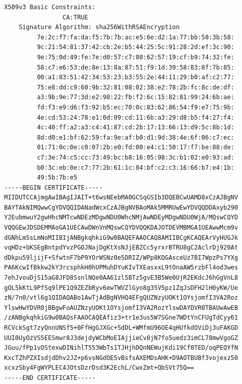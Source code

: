 \documentclass[a4paper]{report}
\begin{document}
\begin{lstlisting}[language={}, basicstyle=\ttfamily\scriptsize, numberstyle=\ttfamily\scriptsize, stepnumber=5, firstnumber=1, numberfirstline=false]
            X509v3 Basic Constraints: 
                CA:TRUE
    Signature Algorithm: sha256WithRSAEncryption
         7e:2c:f7:fa:da:f5:7b:7b:ac:e5:6e:d2:1a:77:bb:58:3b:58:
         9c:21:54:81:37:42:cb:2e:b5:44:25:5c:91:28:2d:ef:3c:90:
         9e:75:0d:49:fe:7e:d0:57:c7:80:62:57:19:cf:b9:74:32:fe:
         58:c7:e6:53:de:8e:13:8a:87:51:f9:1d:39:58:83:8f:7b:85:
         00:a1:83:51:42:34:53:23:b3:55:2e:44:11:29:b0:af:c2:77:
         75:e8:dd:c9:60:9b:32:81:08:02:38:e2:78:2b:fc:8c:de:df:
         a3:9b:9e:77:3d:e2:98:22:fb:f2:6c:15:82:81:99:24:6b:ae:
         fd:f3:e9:d6:f3:92:b5:ec:70:0c:83:62:86:54:f9:e7:75:9b:
         4e:cd:53:24:78:e1:0d:09:cd:11:6b:a3:29:d8:b5:f4:27:f4:
         4c:40:ff:a2:a3:c4:41:87:cd:2b:17:13:66:13:d9:5c:8b:1d:
         8d:d0:e1:bf:62:59:fa:9e:af:b0:d1:9d:38:4e:6f:06:c7:ec:
         01:71:0c:0e:c0:07:2b:e0:fd:00:e4:c1:50:17:f7:be:88:de:
         c7:3e:74:c5:cc:73:49:bc:b8:16:05:98:3c:b1:02:e0:93:ad:
         b0:3c:eb:0e:c7:77:2b:61:1c:84:bf:c2:c3:16:66:b7:e4:1b:
         49:5b:7b:e5
-----BEGIN CERTIFICATE-----
MIIDUTCCAjmgAwIBAgIJAIT+t6wsNEebMA0GCSqGSIb3DQEBCwUAMD8xCzAJBgNV
BAYTAkNIMQwwCgYDVQQIDANadWcxCzAJBgNVBAoMAk5MMRUwEwYDVQQDDAxyb290
Y2EubmwuY2gwHhcNMTcwNDEzMDgwNDU0WhcNMjAwNDEyMDgwNDU0WjA/MQswCQYD
VQQGEwJDSDEMMAoGA1UECAwDWnVnMQswCQYDVQQKDAJOTDEVMBMGA1UEAwwMcm9v
dGNhLm5sLmNoMIIBIjANBgkqhkiG9w0BAQEFAAOCAQ8AMIIBCgKCAQEArVyHUGJk
vqHDz+bKSEgBntpdYvzPGOJNajDgKtXsNJjEBZCc5yrxrBTRU8gC2AclrDj920At
dDkpu59ljijF+SfwtnF7bP9YOrWSNz0e5DRIZ/WPp8KQGAsceUz7BI7WpzPs7YXg
PA6KcwIfBkkw2kY3rcsphkH0hUPMuhDYuKIvTXEasxxL9tOnaAW5rzbFl4od3wes
7ehJvouDjS15aG8JFD8SsnlNQe0AA61zl5BTz5gvE3B5We0UjR2EKdcJ6hGgVnL8
gOL5kKtL9PfSq9lPE1Q9ZEZbRyv6ewTWVZlGyo8g35V5pz1ZqJsDFH2lH0yKW/Ue
zN/7n0/vtl6g1QIDAQABo1AwTjAdBgNVHQ4EFgQUZNzyUOKt1OYsjomfI3VA2Roz
YlswHwYDVR0jBBgwFoAUZNzyUOKt1OYsjomfI3VA2RozYlswDAYDVR0TBAUwAwEB
/zANBgkqhkiG9w0BAQsFAAOCAQEAfiz3+tr1e3us5W7SGne7WDtYnCFUgTdCyy61
RCVckSgt7zyQnnUNSf5+0FfHgGJXGc+5dDL+WMfmU96OE4qHUfkdOViDj3uFAKGD
UUI0UyOzVS5EESmwr8J3dejdyWCbMoEIAjjieCv8jN7fo5uedz3imCL78mwVgoGZ
JGuu/fPp1vOStexwDINihlT553WbTs1TJHjhDQnNEWujKdi19Cf0TED/oqPEQYfN
KxcTZhPZXIsdjdDhv2JZ+p6vsNGdOE5vBsfsAXEMDsAHK+D9AOTBUBf3vojexz50
xcxzSby4FgWYPLEC4JOtsDzrDsd3K2EchL/CwxZmt+QbSVt75Q==
-----END CERTIFICATE-----
\end{lstlisting}

\newpage

\printbibliography
\end{document}

